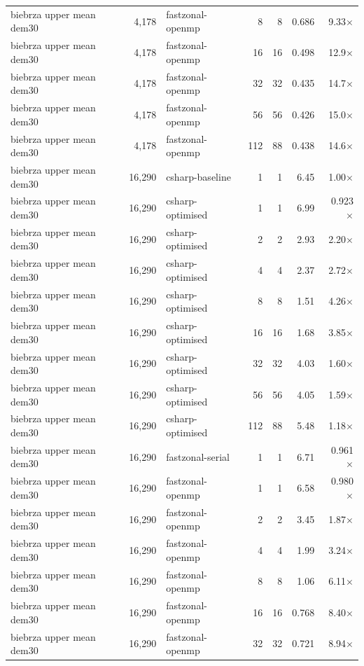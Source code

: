 \begin{tabular}{lrlrrrr}
biebrza upper mean dem30 & 4,178 & fastzonal-openmp & 8 & 8 & 0.686 & 9.33$\times$ \\
biebrza upper mean dem30 & 4,178 & fastzonal-openmp & 16 & 16 & 0.498 & 12.9$\times$ \\
biebrza upper mean dem30 & 4,178 & fastzonal-openmp & 32 & 32 & 0.435 & 14.7$\times$ \\
biebrza upper mean dem30 & 4,178 & fastzonal-openmp & 56 & 56 & 0.426 & 15.0$\times$ \\
biebrza upper mean dem30 & 4,178 & fastzonal-openmp & 112 & 88 & 0.438 & 14.6$\times$ \\
biebrza upper mean dem30 & 16,290 & csharp-baseline & 1 & 1 & 6.45 & 1.00$\times$ \\
biebrza upper mean dem30 & 16,290 & csharp-optimised & 1 & 1 & 6.99 & 0.923$\times$ \\
biebrza upper mean dem30 & 16,290 & csharp-optimised & 2 & 2 & 2.93 & 2.20$\times$ \\
biebrza upper mean dem30 & 16,290 & csharp-optimised & 4 & 4 & 2.37 & 2.72$\times$ \\
biebrza upper mean dem30 & 16,290 & csharp-optimised & 8 & 8 & 1.51 & 4.26$\times$ \\
biebrza upper mean dem30 & 16,290 & csharp-optimised & 16 & 16 & 1.68 & 3.85$\times$ \\
biebrza upper mean dem30 & 16,290 & csharp-optimised & 32 & 32 & 4.03 & 1.60$\times$ \\
biebrza upper mean dem30 & 16,290 & csharp-optimised & 56 & 56 & 4.05 & 1.59$\times$ \\
biebrza upper mean dem30 & 16,290 & csharp-optimised & 112 & 88 & 5.48 & 1.18$\times$ \\
biebrza upper mean dem30 & 16,290 & fastzonal-serial & 1 & 1 & 6.71 & 0.961$\times$ \\
biebrza upper mean dem30 & 16,290 & fastzonal-openmp & 1 & 1 & 6.58 & 0.980$\times$ \\
biebrza upper mean dem30 & 16,290 & fastzonal-openmp & 2 & 2 & 3.45 & 1.87$\times$ \\
biebrza upper mean dem30 & 16,290 & fastzonal-openmp & 4 & 4 & 1.99 & 3.24$\times$ \\
biebrza upper mean dem30 & 16,290 & fastzonal-openmp & 8 & 8 & 1.06 & 6.11$\times$ \\
biebrza upper mean dem30 & 16,290 & fastzonal-openmp & 16 & 16 & 0.768 & 8.40$\times$ \\
biebrza upper mean dem30 & 16,290 & fastzonal-openmp & 32 & 32 & 0.721 & 8.94$\times$ \\

\end{tabular}
